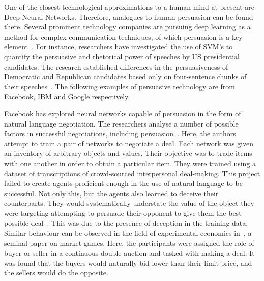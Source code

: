 One of the closest technological approximations to a human mind at present are Deep Neural Networks. Therefore, analogues to human persuasion can be found there. Several prominent technology companies are pursuing deep learning as a method for complex communication techniques, of which persuasion is a key element~\cite{Dulac-Arnold2015DeepSpaces, Lowe2019OnCommunication, Guo2017LearningTexts}. For instance, researchers have investigated the use of SVM's to quantify the persuasive and rhetorical power of speeches by US presidential candidates. The research established differences in the persuasiveness of Democratic and Republican candidates based only on four-sentence chunks of their speeches~\cite{Strapparava2010PredictingDiscourses}. The following examples of persuasive technology are from Facebook, IBM and Google respectively.

Facebook has explored neural networks capable of persuasion in the form of natural language negotiation. The researchers analyse a number of possible factors in successful negotiations, including persuasion~\cite{Lewis2017DealDialogues}. Here, the authors attempt to train a pair of networks to negotiate a deal. Each network was given an inventory of arbitrary objects and values. Their objective was to trade items with one another in order to obtain a particular item. They were trained using a dataset of transcriptions of crowd-sourced interpersonal deal-making. This project failed to create agents proficient enough in the use of natural language to be successful. Not only this, but the agents also learned to deceive their counterparts. They would systematically understate the value of the object they were targeting attempting to persuade their opponent to give them the best possible deal~\cite{Lewis2017DealDialogues}. This was due to the presence of deception in the training data. Similar behaviour can be observed in the field of experimental economics in~\cite{Smith1976ExperimentalTheory}, a seminal paper on market games. Here, the participants were assigned the role of buyer or seller in a continuous double auction and tasked with making a deal. It was found that the buyers would naturally bid lower than their limit price, and the sellers would do the opposite.

